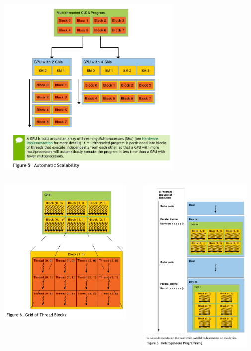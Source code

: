 \begin{frame}[fragile]
\includegraphics[width=9.0cm]{graphs/blocks_per_sm.png}
\end{frame}

\begin{frame}
\begin{columns}
\begin{column}{0.55\textwidth}
\includegraphics[width=6.5cm]{graphs/grid_of_blocks.png}
\end{column}
\begin{column}{0.45\textwidth}
\includegraphics[width=5.5cm]{graphs/heterogeneous.png}
\end{column}
\end{columns}
\end{frame}



